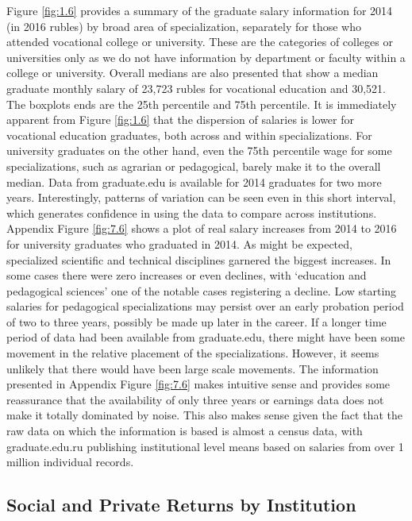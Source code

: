 \documentclass[alpha-refs]{wiley-article-05g}
\begin{document}
Figure \ref{fig:1.6} provides a summary of the graduate salary information for 2014 (in 2016 rubles) by broad area of specialization, separately for those who attended vocational college or university. These are the categories of colleges or universities only as we do not have information by department or faculty within a college or university. Overall medians are also presented that show a median graduate monthly salary of 23,723 rubles for vocational education and 30,521. The boxplots ends are the 25th percentile and 75th percentile. It is immediately apparent from Figure \ref{fig:1.6} that the dispersion of salaries is lower for vocational education graduates, both across and within specializations. For university graduates on the other hand, even the 75th percentile wage for some specializations, such as agrarian or pedagogical, barely make it to the overall median. Data from graduate.edu is available for 2014 graduates for two more years. Interestingly, patterns of variation can be seen even in this short interval, which generates confidence in using the data to compare across institutions. Appendix Figure \ref{fig:7.6} shows a plot of real salary increases from 2014 to 2016 for university graduates who graduated in 2014. As might be expected, specialized scientific and technical disciplines garnered the biggest increases.  In some cases there were zero increases or even declines, with `education and pedagogical sciences' one of the notable cases registering a decline. Low starting salaries for pedagogical specializations may persist over an early probation period of two to three years, possibly be made up later in the career. If a longer time period of data had been available from graduate.edu, there might have been some movement in the relative placement of the specializations.  However, it seems unlikely that there would have been large scale movements. The information presented in Appendix Figure \ref{fig:7.6} makes intuitive sense and provides some reassurance that the availability of only three years or earnings data does not make it totally dominated by noise. This also makes sense given the fact that the raw data on which the information is based is almost a census data, with graduate.edu.ru publishing institutional level means based on salaries from over 1 million individual records. 

\vspace{-2em}

\subsection{Social and Private Returns by Institution}
\end{document}
